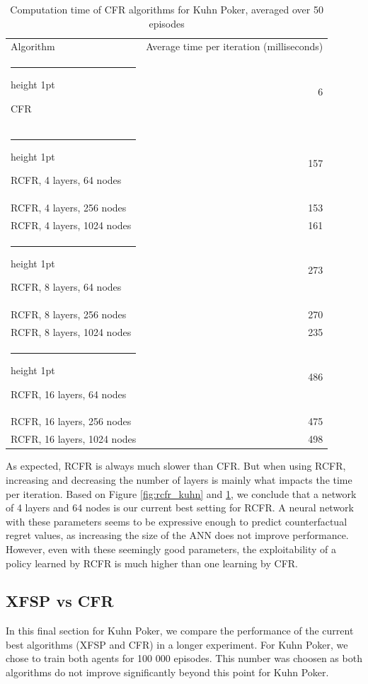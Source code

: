 \documentclass[10pt,a4paper]{article}
\makeatletter
\newcommand{\thickhline}{%
    \noalign {\ifnum 0=`}\fi \hrule height 1pt
    \futurelet \reserved@a \@xhline
}
\makeatother
\begin{document}
\begin{table}[h]
\centering
\begin{tabular}{|l|r|}
\hline
Algorithm & Average time per iteration (milliseconds)\\
\thickhline
CFR & 6 \\
\thickhline
RCFR, 4 layers, 64 nodes& 157 \\
\hline
RCFR, 4 layers, 256 nodes & 153 \\
\hline
RCFR, 4 layers, 1024 nodes & 161 \\
\thickhline
RCFR, 8 layers, 64 nodes & 273 \\
\hline
RCFR, 8 layers, 256 nodes  & 270 \\
\hline
RCFR, 8 layers, 1024 nodes  & 235 \\
\thickhline
RCFR, 16 layers, 64 nodes & 486 \\
\hline
RCFR, 16 layers, 256 nodes & 475 \\
\hline
RCFR, 16 layers, 1024 nodes & 498 \\
\hline
\end{tabular}
\caption{Computation time of CFR algorithms for Kuhn Poker, averaged over 50 episodes}
\label{tbl:kuhn_times}
\end{table}

As expected, RCFR is always much slower than CFR. But when using RCFR, increasing and decreasing the number of layers is mainly what impacts the time per iteration. Based on Figure \ref{fig:rcfr_kuhn} and \ref{tbl:kuhn_times}, we conclude that a network of 4 layers and 64 nodes is our current best setting for RCFR. A neural network with these parameters seems to be expressive enough to predict counterfactual regret values, as increasing the size of the ANN does not improve performance. However, even with these seemingly good parameters, the exploitability of a policy learned by RCFR is much higher than one learning by CFR. 

\subsection{XFSP vs CFR}
 In this final section for Kuhn Poker, we compare the performance of the current best algorithms (XFSP and CFR) in a longer experiment. For Kuhn Poker, we chose to train both agents for 100 000 episodes. This number was choosen as both algorithms do not improve significantly beyond this point for Kuhn Poker.
\end{document}
